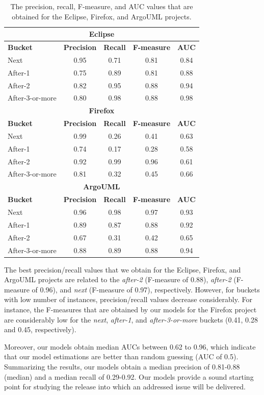 \begin{table}
	\footnotesize
	\centering
	\caption{The precision, recall, F-measure, and AUC values that are
	obtained for the Eclipse, Firefox, and ArgoUML projects. 
	\label{ch4:tbl:evaluation_metrics}
	}
	\begin{tabular}{lcccc}
		\hline
		\multicolumn{5}{c}{\textbf{Eclipse}}\tabularnewline
		\hline 
		\textbf{Bucket} & \textbf{Precision} & \textbf{Recall} &
		\textbf{F-measure} & \textbf{AUC}\tabularnewline
		\hline 
		Next & 0.95  & 0.71  & 0.81 & 0.84 \tabularnewline
		\hline 
		After-1 & 0.75 & 0.89 & 0.81 & 0.88\tabularnewline
		\hline 
		After-2 & 0.82 & 0.95 & 0.88 & 0.94\tabularnewline
		\hline 
		After-3-or-more & 0.80 & 0.98 & 0.88 & 0.98\tabularnewline
		\hline 
		\hline
		\multicolumn{5}{c}{\textbf{Firefox}}\tabularnewline
		\hline 
		\textbf{Bucket} & \textbf{Precision} & \textbf{Recall} &
		\textbf{F-measure} & \textbf{AUC}\tabularnewline
		\hline 
		Next & 0.99  & 0.26  & 0.41 & 0.63 \tabularnewline
		\hline 
		After-1 & 0.74 & 0.17 & 0.28 & 0.58\tabularnewline
		\hline 
		After-2 & 0.92 & 0.99 & 0.96 & 0.61\tabularnewline
		\hline 
		After-3-or-more & 0.81 & 0.32 & 0.45 & 0.66\tabularnewline
		\hline 
		\hline
		\multicolumn{5}{c}{\textbf{ArgoUML}}\tabularnewline
		\hline 
		\textbf{Bucket} & \textbf{Precision} & \textbf{Recall} &
		\textbf{F-measure} & \textbf{AUC}\tabularnewline
		\hline 
		Next & 0.96  & 0.98  & 0.97 & 0.93 \tabularnewline
		\hline 
		After-1 & 0.89 & 0.87 & 0.88 & 0.92\tabularnewline
		\hline 
		After-2 & 0.67 & 0.31 & 0.42 & 0.65\tabularnewline
		\hline 
		After-3-or-more & 0.88 & 0.89 & 0.88 & 0.94\tabularnewline
		\hline 
	\end{tabular}
\end{table}

The best precision/recall values that we obtain for the Eclipse, Firefox, and
ArgoUML projects are related to the \textit{after-2} (F-measure of 0.88),
\textit{after-2} (F-measure of 0.96), and \textit{next} (F-measure of 0.97),
respectively. However, for buckets with low number of instances,
precision/recall values decrease considerably. For instance, the F-measures that
are obtained by our models for the Firefox project are considerably low for the
\textit{next}, \textit{after-1}, and \textit{after-3-or-more} buckets (0.41,
0.28 and 0.45, respectively).

Moreover, our models obtain median AUCs between 0.62 to 0.96, which indicate
that our model estimations are better than random guessing (AUC of 0.5).
Summarizing the results, our models obtain a median precision of 0.81-0.88
(median) and a median recall of 0.29-0.92. Our models provide a sound starting
point for studying the release into which an addressed issue will be delivered.\\

